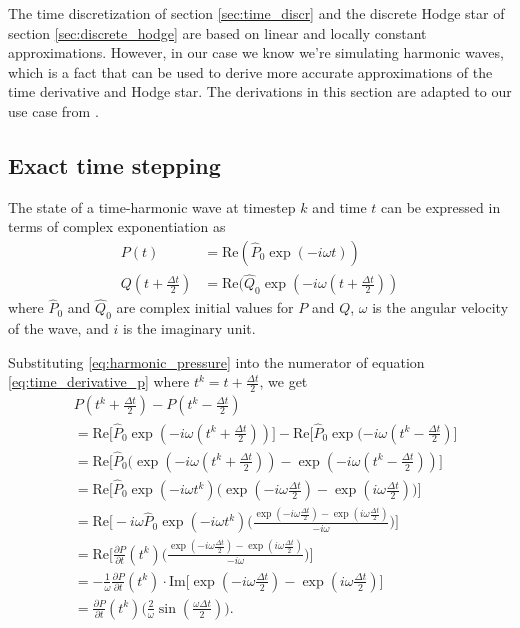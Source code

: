 \documentclass[utf8,english]{gradu3}
\begin{document}
The time discretization of section \ref{sec:time_discr}
and the discrete Hodge star of section \ref{sec:discrete_hodge}
are based on linear and locally constant approximations.
However, in our case we know we're simulating harmonic waves,
which is a fact that can be used to derive more accurate approximations
of the time derivative and Hodge star.
The derivations in this section are adapted to our use case
from \parencite{rabina_numerical_2014}.


\subsection{Exact time stepping}\label{sec:exact_timestep}

The state of a time-harmonic wave at timestep $k$ and time $t$
can be expressed in terms of complex exponentiation as
\begin{align}
\label{eq:harmonic_pressure}
P(t) &= \text{Re}(\hat{P}_0 \exp(-i\omega t)) \\
\label{eq:harmonic_flux}
Q(t + \frac{\Delta t}{2}) &= \text{Re}(\hat{Q}_0 \exp(-i\omega (t + \frac{\Delta t}{2}))
\end{align}
where $\hat{P}_0$ and $\hat{Q}_0$ are complex initial values for $P$ and $Q$,
$\omega$ is the angular velocity of the wave, and $i$ is the imaginary unit.

Substituting \eqref{eq:harmonic_pressure}
into the numerator of equation \eqref{eq:time_derivative_p}
where $t^k = t + \frac{\Delta t}{2}$, we get
\begin{align*}
& P(t^k + \frac{\Delta t}{2}) - P(t^k - \frac{\Delta t}{2}) \\
&= \text{Re} \Big[ \hat{P}_0 \exp(-i\omega (t^k + \frac{\Delta t}{2})) \Big]
- \text{Re} \Big[ \hat{P}_0 \exp(-i\omega (t^k - \frac{\Delta t}{2}) \Big] \\
&= \text{Re} \Big[ \hat{P}_0 (\exp(-i\omega (t^k + \frac{\Delta t}{2}))
- \exp(-i\omega (t^k - \frac{\Delta t}{2})) \Big] \\
&= \text{Re} \Big[ \hat{P}_0 \exp(-i\omega t^k)
\Big( \exp(-i\omega \frac{\Delta t}{2}) - \exp(i\omega \frac{\Delta t}{2}) \Big) \Big] \\
&= \text{Re} \Big[ -i\omega \hat{P}_0 \exp(-i\omega t^k)
\Big(\frac{\exp(-i\omega \frac{\Delta t}{2}) - \exp(i\omega \frac{\Delta t}{2})}{-i\omega}\Big) \Big] \\
&= \text{Re} \Big[ \frac{\partial P}{\partial t}(t^k)
\Big(\frac{\exp(-i\omega \frac{\Delta t}{2}) - \exp(i\omega \frac{\Delta t}{2})}{-i\omega}\Big) \Big] \\
&= - \frac{1}{\omega} \frac{\partial P}{\partial t}(t^k)
\cdot \text{Im} \Big[\exp(-i\omega \frac{\Delta t}{2}) - \exp(i\omega \frac{\Delta t}{2}) \Big] \\
&= \frac{\partial P}{\partial t}(t^k) \Big(\frac{2}{\omega} \sin(\frac{\omega \Delta t}{2}) \Big).
\end{align*}
\end{document}
